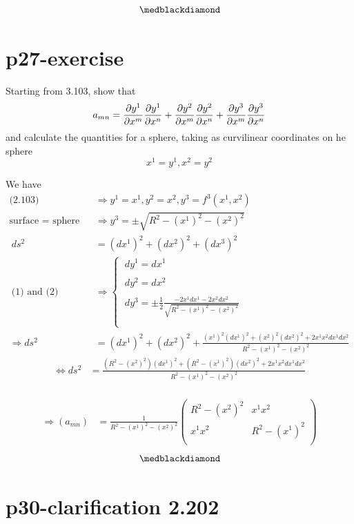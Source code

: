 $$\medblackdiamond$$
\newpage


\section{p27-exercise}

\begin{tcolorbox}
Starting from 3.103, show that $$a_{mn} = \pdv{y^1}{x^m}\pdv{y^1}{x^n}+\pdv{y^2}{x^m}\pdv{y^2}{x^n}+\pdv{y^3}{x^m}\pdv{y^3}{x^n}$$ and calculate the quantities for a sphere, taking as curvilinear coordinates on he sphere $$x^1 = y^1 , x^2 = y^2$$
\end{tcolorbox}
We have
\begin{align}
\text{(2.103)}\quad &\Rightarrow y^1 = x^1 , y^2 = x^2, y^3 = f^3(x^1,x^2)\\
\text{surface = sphere}\quad &\Rightarrow y^3 = \pm \sqrt{R^2 -(x^1)^2-(x^2)^2}\\
\ ds^2 &= (dx^1)^2+(dx^2)^2+(dx^3)^2\\
\ \text{(1) and (2)}\quad& \Rightarrow \left\{ \begin{array}{c} 
\ dy^1 = dx^1\\\\
\ dy^2 = dx^2\\\\
\ dy^3 = \pm \frac{1}{2} \frac{-2x^1dx^1 - 2x^2dx^2}{\sqrt{R^2 -(x^1)^2-(x^2)^2}}\\\\
\end{array}
\right.\\
\Rightarrow ds^2 & = (dx^1)^2 +  (dx^2)^2 + \frac{(x^1)^2(dx^1)^2 + (x^2)^2(dx^2)^2  + 2 x^1x^2dx^1dx^2}{R^2 -(x^1)^2-(x^2)^2}
\end{align}
\begin{align}
\Leftrightarrow ds^2 & = \frac{(R^2 - (x^2)^2) (dx^1)^2 + (R^2 -(x^1)^2) (dx^2)^2  + 2 x^1x^2dx^1dx^2}{R^2 -(x^1)^2-(x^2)^2}
\end{align}\\
\begin{align}
\Rightarrow (a_{mn}) &= \frac{1}{R^2 -(x^1)^2-(x^2)^2}\begin{pmatrix}
 R^2 - (x^2)^2&x^1x^2 \\
x^1x^2 & R^2 - (x^1)^2 \\
\end{pmatrix}
\end{align}
$$\medblackdiamond$$
\newpage


\section{p30-clarification 2.202}

